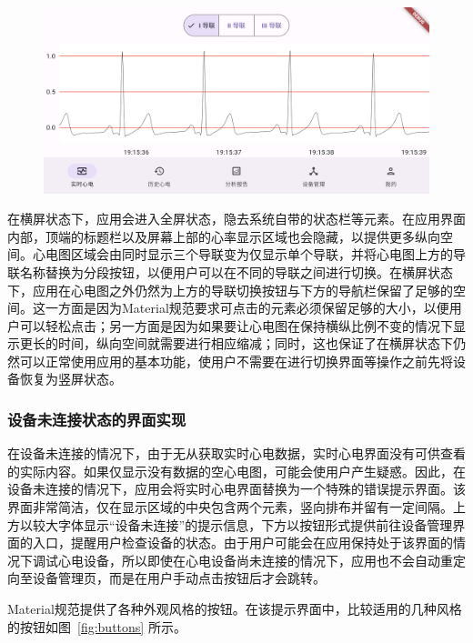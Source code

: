 \begin{figure}[!ht]
    \includegraphics[width=\textwidth]{../assets/real-time-landscape}
    \label{fig:real-time-landscape}
\end{figure}

在横屏状态下，应用会进入全屏状态，隐去系统自带的状态栏等元素。在应用界面内部，顶端的标题栏以及屏幕上部的心率显示区域也会隐藏，以提供更多纵向空间。心电图区域会由同时显示三个导联变为仅显示单个导联，并将心电图上方的导联名称替换为分段按钮，以便用户可以在不同的导联之间进行切换。在横屏状态下，应用在心电图之外仍然为上方的导联切换按钮与下方的导航栏保留了足够的空间。这一方面是因为Material规范要求可点击的元素必须保留足够的大小，以便用户可以轻松点击；另一方面是因为如果要让心电图在保持横纵比例不变的情况下显示更长的时间，纵向空间就需要进行相应缩减；同时，这也保证了在横屏状态下仍然可以正常使用应用的基本功能，使用户不需要在进行切换界面等操作之前先将设备恢复为竖屏状态。

\subsubsection{设备未连接状态的界面实现}\label{subsubsec:real-time-na-ui}

在设备未连接的情况下，由于无从获取实时心电数据，实时心电界面没有可供查看的实际内容。如果仅显示没有数据的空心电图，可能会使用户产生疑惑。因此，在设备未连接的情况下，应用会将实时心电界面替换为一个特殊的错误提示界面。该界面非常简洁，仅在显示区域的中央包含两个元素，竖向排布并留有一定间隔。上方以较大字体显示“设备未连接”的提示信息，下方以按钮形式提供前往设备管理界面的入口，提醒用户检查设备的状态。由于用户可能会在应用保持处于该界面的情况下调试心电设备，所以即使在心电设备尚未连接的情况下，应用也不会自动重定向至设备管理页，而是在用户手动点击按钮后才会跳转。

Material规范提供了各种外观风格的按钮。在该提示界面中，比较适用的几种风格的按钮如图~\ref{fig:buttons} 所示。

